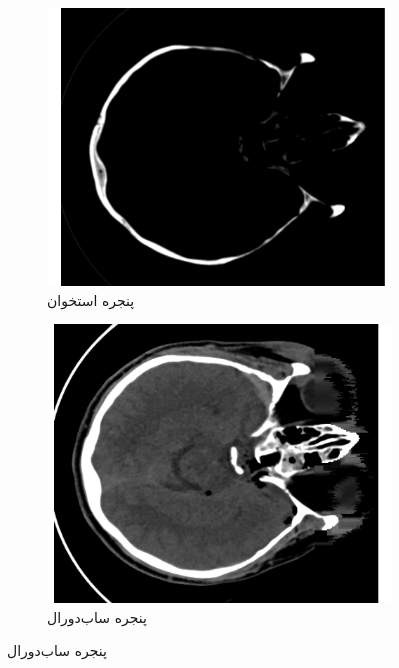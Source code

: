 \begin{figure}[h!]
\begin{subfigure}{0.33\textwidth}
    \end{subfigure}\hfil %
    \begin{subfigure}{0.33\textwidth}
      \includegraphics[width=\linewidth]{Images/chapter2/bone_window_no_caption.png}
      \caption{پنجره استخوان}
      \label{fig:ch2-bone-window}
    \end{subfigure}\hfil %
    \begin{subfigure}{0.33\textwidth}
      \includegraphics[width=\linewidth]{Images/chapter2/subdural_window_no_caption.png}
      \caption{پنجره ساب‌دورال}
      \label{fig:ch2-subdural-window}

\end{subfigure}
\end{figure}
